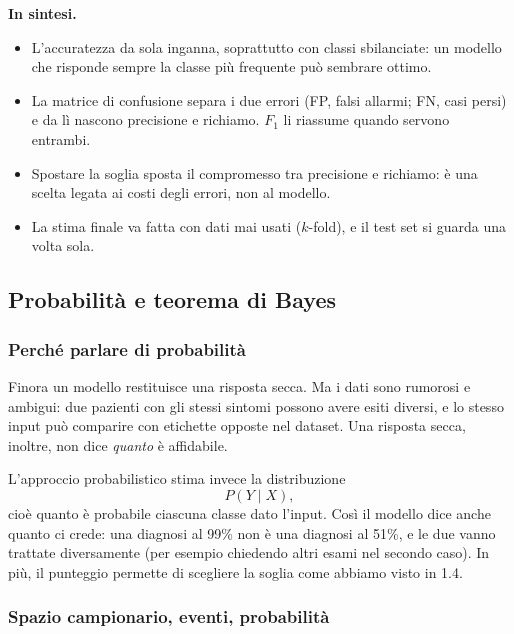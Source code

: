 \documentclass[12pt]{extarticle}
\begin{document}
\noindent\textbf{In sintesi.}
\begin{itemize}
    \item L'accuratezza da sola inganna, soprattutto con classi sbilanciate: un modello che risponde sempre la classe più frequente può sembrare ottimo.
    \item La matrice di confusione separa i due errori (FP, falsi allarmi; FN, casi persi) e da lì nascono precisione e richiamo. $F_1$ li riassume quando servono entrambi.
    \item Spostare la soglia sposta il compromesso tra precisione e richiamo: è una scelta legata ai costi degli errori, non al modello.
    \item La stima finale va fatta con dati mai usati ($k$-fold), e il test set si guarda una volta sola.
\end{itemize}

\subsection{Probabilità e teorema di Bayes}

\subsubsection{Perché parlare di probabilità}

\noindent Finora un modello restituisce una risposta secca. Ma i dati sono rumorosi e ambigui: due pazienti con gli stessi sintomi possono avere esiti diversi, e lo stesso input può comparire con etichette opposte nel dataset. Una risposta secca, inoltre, non dice \emph{quanto} è affidabile.

\noindent L'approccio probabilistico stima invece la distribuzione
\[
P(Y \mid X),
\]
cioè quanto è probabile ciascuna classe dato l'input. Così il modello dice anche quanto ci crede: una diagnosi al 99\% non è una diagnosi al 51\%, e le due vanno trattate diversamente (per esempio chiedendo altri esami nel secondo caso). In più, il punteggio permette di scegliere la soglia come abbiamo visto in 1.4.

\subsubsection{Spazio campionario, eventi, probabilità}
\end{document}
